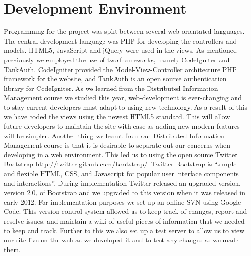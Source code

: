 \documentclass{l3proj}
\begin{document}
\section{Development Environment}
Programming for the project was split between several web-orientated languages. The central development language was PHP for developing the controllers and models. HTML5, JavaScript and jQuery were used in the views. As mentioned previously we employed the use of two frameworks, namely CodeIgniter and TankAuth. CodeIgniter provided the Model-View-Controller architecture PHP framework for the website, and TankAuth is an open source authentication library for CodeIgniter.\newline
\newline
As we learned from the Distributed Information Management course we studied this year, web-development is ever-changing and to stay current developers must adapt to using new technology. As a result of this we have coded the views using the newest HTML5 standard. This will allow future developers to maintain the site with ease as adding new modern features will be simpler.\newline
\newline
Another thing we learnt from our Distributed Information Management course is that it is desirable to separate out our concerns when developing in a web environment. This led us to using the open source Twitter Bootstrap \url{http://twitter.github.com/bootstrap/}. Twitter Bootstrap is “simple and flexible HTML, CSS, and Javascript for popular user interface components and interactions”. During implementation Twitter released an upgraded version, version 2.0, of Bootstrap and we upgraded to this version when it was released in early 2012.\newline
\newline
For implementation purposes we set up an online SVN using Google Code. This version control system allowed us to keep track of changes, report and resolve issues, and maintain a wiki of useful pieces of information that we needed to keep and track.\newline
\newline
Further to this we also set up a test server to allow us to view our site live on the web as we developed it and to test any changes as we made them.\newline
\newline

\end{document}
